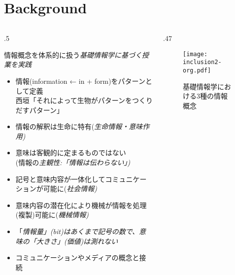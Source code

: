 \def\Title{\hfill \huge{コミュニケーション/メディア概念と関連付けた情報概念の形式化} \hfill}
\def\Author{大西 洋 (京都市立西京高校)}




\nocite{*}
\Header

\section{Background}
\begin{columns}[onlytextwidth,t]
\begin{column}{.5\hsize}
\begin{block}{\insertsection}
\alert{情報}概念を体系的に扱う\em{基礎情報学}\cite{nishigaki1}\cite{nishigaki2}\cite{nishigaki3}に基づく授業を実践\cite{ohnishi}
\begin{itemize}
\item 情報(information ← \alert{in} + \alert{form})をパターンとして定義 \\ 西垣「それによって生物がパターンをつくりだすパターン」\cite{nishigaki1}
\item 情報の解釈は生命に特有(\em{生命情報}・意味作用)
\item 意味は客観的に定まるものではない \\ (情報の\em{主観性}:「情報は伝わらない」)
\item 記号と意味内容が一体化してコミュニケーションが可能に(\em{社会情報})
\item 意味内容の潜在化により機械が情報を処理(複製)可能に(\em{機械情報})
\item 「\em{情報量}」(bit)はあくまで記号の数で、意味の「大きさ」(価値)は測れない
\item コミュニケーションやメディアの概念と接続
\end{itemize}
\end{block}
\end{column}
\begin{column}{.47\hsize}
\begin{figure}[hbtp]{\centering
\texttt{[image: inclusion2-org.pdf]}
\caption{基礎情報学における3種の情報概念}
}\end{figure}
\end{column}
\end{columns}

